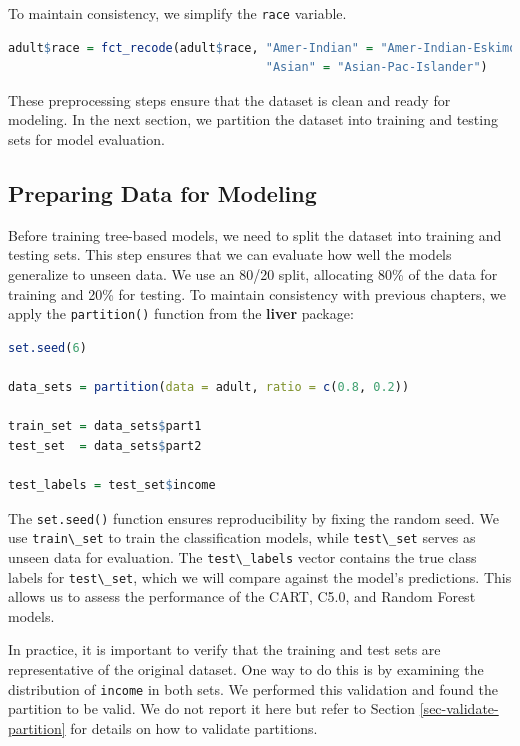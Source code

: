 \documentclass[
  11pt,
]{book}
\newcommand{\passthrough}[1]{#1}
\theoremstyle{definition}
\theoremstyle{definition}
\theoremstyle{definition}
\theoremstyle{definition}
\theoremstyle{remark}
\begin{document}
To maintain consistency, we simplify the \passthrough{\lstinline!race!} variable.

\begin{lstlisting}[language=R]
adult$race = fct_recode(adult$race, "Amer-Indian" = "Amer-Indian-Eskimo", 
                                    "Asian" = "Asian-Pac-Islander")
\end{lstlisting}

These preprocessing steps ensure that the dataset is clean and ready for modeling. In the next section, we partition the dataset into training and testing sets for model evaluation.

\subsection*{Preparing Data for Modeling}\label{preparing-data-for-modeling-2}


Before training tree-based models, we need to split the dataset into training and testing sets. This step ensures that we can evaluate how well the models generalize to unseen data. We use an 80/20 split, allocating 80\% of the data for training and 20\% for testing. To maintain consistency with previous chapters, we apply the \passthrough{\lstinline!partition()!} function from the \textbf{liver} package:

\begin{lstlisting}[language=R]
set.seed(6)

data_sets = partition(data = adult, ratio = c(0.8, 0.2))

train_set = data_sets$part1
test_set  = data_sets$part2

test_labels = test_set$income
\end{lstlisting}

The \passthrough{\lstinline!set.seed()!} function ensures reproducibility by fixing the random seed. We use \passthrough{\lstinline!train\_set!} to train the classification models, while \passthrough{\lstinline!test\_set!} serves as unseen data for evaluation. The \passthrough{\lstinline!test\_labels!} vector contains the true class labels for \passthrough{\lstinline!test\_set!}, which we will compare against the model's predictions. This allows us to assess the performance of the CART, C5.0, and Random Forest models.

In practice, it is important to verify that the training and test sets are representative of the original dataset. One way to do this is by examining the distribution of \passthrough{\lstinline!income!} in both sets. We performed this validation and found the partition to be valid. We do not report it here but refer to Section \ref{sec-validate-partition} for details on how to validate partitions.
\end{document}
